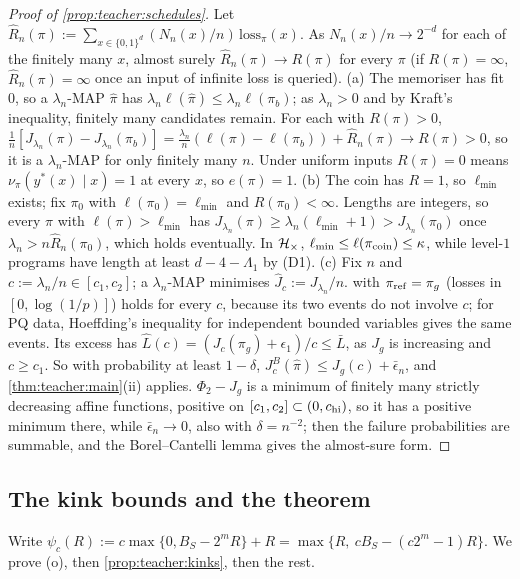 \begin{proof}[Proof of \cref{prop:teacher:schedules}]
Let $\hat R_n(\pi):=\sum_{x\in\{0,1\}^d}(N_n(x)/n)\,\mathrm{loss}_\pi(x)$. As $N_n(x)/n\to2^{-d}$ for each of the finitely many $x$, almost surely $\hat R_n(\pi)\to R(\pi)$ for every $\pi$ (if $R(\pi)=\infty$, $\hat R_n(\pi)=\infty$ once an input of infinite loss is queried).
(a) The memoriser has fit $0$, so a $\lambda_n$-MAP $\hat\pi$ has $\lambda_n\ell(\hat\pi)\le\lambda_n\ell(\pi_b)$; as $\lambda_n>0$ and by Kraft's inequality, finitely many candidates remain. For each with $R(\pi)>0$, $\frac1n[J_{\lambda_n}(\pi)-J_{\lambda_n}(\pi_b)]=\frac{\lambda_n}n(\ell(\pi)-\ell(\pi_b))+\hat R_n(\pi)\to R(\pi)>0$, so it is a $\lambda_n$-MAP for only finitely many $n$. Under uniform inputs $R(\pi)=0$ means $\nu_\pi(y^*(x)\mid x)=1$ at every $x$, so $e(\pi)=1$.
(b) The coin has $R=1$, so $\ell_{\min}$ exists; fix $\pi_0$ with $\ell(\pi_0)=\ell_{\min}$ and $R(\pi_0)<\infty$. Lengths are integers, so every $\pi$ with $\ell(\pi)>\ell_{\min}$ has $J_{\lambda_n}(\pi)\ge\lambda_n(\ell_{\min}+1)>J_{\lambda_n}(\pi_0)$ once $\lambda_n>n\hat R_n(\pi_0)$, which holds eventually. In $\mathcal{H}_{\times}$, $\ell_{\min}\le\ell(\pi_{\rm coin})\le\kappa$, while level-$1$ programs have length at least $d-4-\Lambda_1$ by (D1).
(c) Fix $n$ and $c:=\lambda_n/n\in[c_1,c_2]$; a $\lambda_n$-MAP minimises $\hat J_c:=J_{\lambda_n}/n$.  with $\pi_{\rm ref}=\pi_g$ (losses in $[0,\log(1/p)]$) holds for every $c$, because its two events do not involve $c$; for PQ data, Hoeffding's inequality for independent bounded variables gives the same events. Its excess has $\hat L(c)=(J_c(\pi_g)+\epsilon_1)/c\le\bar L$, as $J_g$ is increasing and $c\ge c_1$. So with probability at least $1-\delta$, $J^B_c(\hat\pi)\le J_g(c)+\bar\epsilon_n$, and \cref{thm:teacher:main}(ii) applies. $\Phi_2-J_g$ is a minimum of finitely many strictly decreasing affine functions, positive on $[c_1,c_2]\subset(0,c_{\rm hi})$, so it has a positive minimum there, while $\bar\epsilon_n\to0$, also with $\delta=n^{-2}$; then the failure probabilities are summable, and the Borel--Cantelli lemma gives the almost-sure form.
\end{proof}

\subsection{The kink bounds and the theorem}\label{app:teacher:main}

Write $\psi_c(R):=c\max\{0,B_S-2^mR\}+R=\max\{R,\ cB_S-(c2^m-1)R\}$. We prove (o), then \cref{prop:teacher:kinks}, then the rest.

